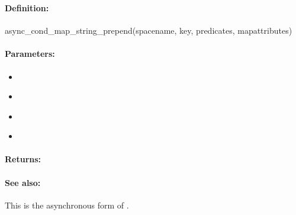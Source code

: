 \pagebreak
\subsubsection{}
\label{api:ruby:async_cond_map_string_prepend}


\paragraph{Definition:}
\begin{rubycode}
async_cond_map_string_prepend(spacename, key, predicates, mapattributes)
\end{rubycode}

\paragraph{Parameters:}
\begin{itemize}[noitemsep]
\item {}\\

\item {}\\

\item {}\\

\item {}\\

\end{itemize}

\paragraph{Returns:}


\paragraph{See also:}  This is the asynchronous form of .

\pagebreak
\subsubsection{}
\label{api:ruby:map_string_append}


